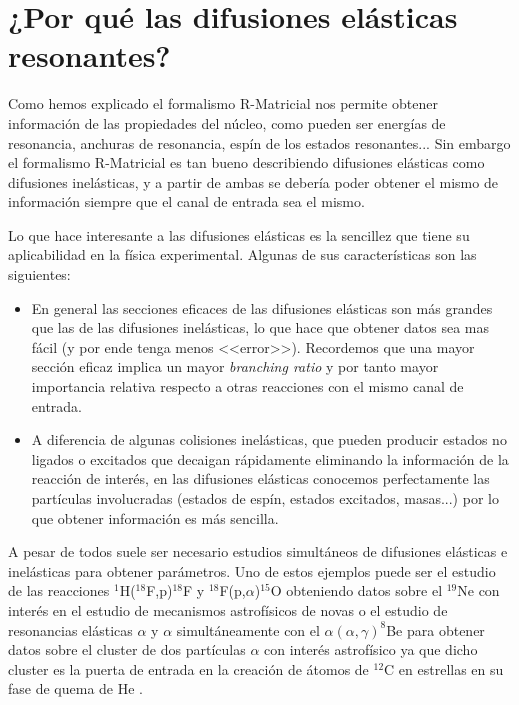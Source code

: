 \documentclass[fleqn,11pt]{SelfArx} %
\begin{document}
\section{¿Por qué las difusiones elásticas resonantes?}

Como hemos explicado el formalismo R-Matricial nos permite obtener información de las propiedades del núcleo, como pueden ser energías de resonancia, anchuras de resonancia, espín de los estados resonantes... Sin embargo el formalismo R-Matricial es tan bueno describiendo difusiones elásticas como difusiones inelásticas, y a partir de ambas se debería poder obtener el mismo de información siempre que el canal de entrada sea el mismo. 

Lo que hace interesante a las difusiones elásticas es la sencillez que tiene su aplicabilidad en la física experimental. Algunas de sus características son las siguientes:

\begin{itemize}
	\item En general las secciones eficaces de las difusiones elásticas son más grandes que las de las difusiones inelásticas, lo que hace que obtener datos sea mas fácil (y por ende tenga menos <<error>>). Recordemos que una mayor sección eficaz implica un mayor \textit{branching ratio} y por tanto mayor importancia relativa respecto a otras reacciones con el mismo canal de entrada. 
	\item A diferencia de algunas colisiones inelásticas, que pueden producir estados no ligados o excitados que decaigan rápidamente eliminando la información de la reacción de interés, en las difusiones elásticas conocemos perfectamente las partículas involucradas (estados de espín, estados excitados, masas...) por lo que obtener información es más sencilla. 
\end{itemize}
A pesar de todos suele ser necesario estudios simultáneos de difusiones elásticas e inelásticas para obtener parámetros. Uno de estos ejemplos puede ser el estudio de las reacciones $^{1}$H($^{18}$F,p)$^{18}$F y $^{18}$F(p,$\alpha$)$^{15}$O obteniendo datos sobre el $^{19}$Ne con interés en el estudio de mecanismos astrofísicos de novas \cite{18Fp} o el estudio de resonancias elásticas $\alpha$ y $\alpha$ simultáneamente con el $\alpha(\alpha,\gamma)^{8}$Be para obtener datos sobre el cluster de dos partículas $\alpha$ con interés astrofísico ya que dicho cluster es la puerta de entrada en la creación de átomos de $^{12}$C en estrellas en su fase de quema de He \cite{AlphaAlpha}. 
\end{document}
